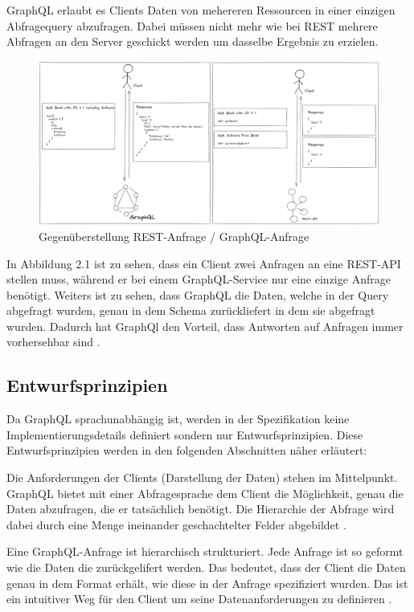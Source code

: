 GraphQL erlaubt es Clients Daten von mehereren Ressourcen in einer einzigen Abfragequery abzufragen.
Dabei müssen nicht mehr wie bei REST mehrere Abfragen an den Server geschickt werden um dasselbe Ergebnis zu erzielen.

\begin{figure}[H]
    \centering
    \includegraphics[width=\textwidth]{pics/graphql_rest_request.png}
    \caption{Gegenüberstellung REST-Anfrage / GraphQL-Anfrage}
\end{figure}

In Abbildung 2.1 ist zu sehen, dass ein Client zwei Anfragen an eine REST-API stellen muss, während er bei einem GraphQL-Service nur eine einzige Anfrage benötigt.
Weiters ist zu sehen, dass GraphQL die Daten, welche in der Query abgefragt wurden, genau in dem Schema zurückliefert in dem sie abgefragt wurden.
Dadurch hat GraphQl den Vorteil, dass Antworten auf Anfragen immer vorhersehbar sind \cite[Abs. Basics of a GraphQL API]{rakutenGraphQLVsRest}.

\subsection{Entwurfsprinzipien}
Da GraphQL sprachunabhängig ist, werden in der Spezifikation keine Implementierungsdetails definiert sondern nur Entwurfsprinzipien.
Diese Entwurfsprinzipien werden in den folgenden Abschnitten näher erläutert:

Die Anforderungen der Clients (Darstellung der Daten) stehen im Mittelpunkt.
GraphQL bietet mit einer Abfragesprache dem Client die Möglichkeit, genau die Daten abzufragen, die er tatsächlich benötigt. Die Hierarchie der
Abfrage wird dabei durch eine Menge ineinander geschachtelter Felder abgebildet \cite[Abs. 1]{graphqlOnline}.

Eine GraphQL-Anfrage ist hierarchisch strukturiert.
Jede Anfrage ist so geformt wie die Daten die zurückgelifert werden.
Das bedeutet, dass der Client die Daten genau in dem Format erhält, wie diese in der Anfrage spezifiziert wurden.
Das ist ein intuitiver Weg für den Client um seine Datenanforderungen zu definieren \cite[Abs. 1]{graphqlOnline}.

